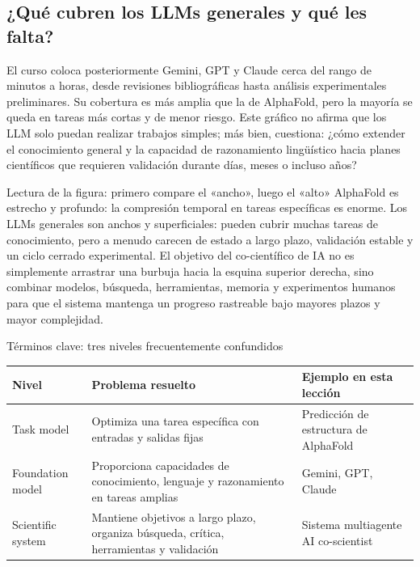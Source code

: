 
\subsection{¿Qué cubren los LLMs generales y qué les falta?}

El curso coloca posteriormente Gemini, GPT y Claude cerca del rango de minutos a horas, desde revisiones bibliográficas hasta análisis experimentales preliminares. Su cobertura es más amplia que la de AlphaFold, pero la mayoría se queda en tareas más cortas y de menor riesgo. Este gráfico no afirma que los LLM solo puedan realizar trabajos simples; más bien, cuestiona: ¿cómo extender el conocimiento general y la capacidad de razonamiento lingüístico hacia planes científicos que requieren validación durante días, meses o incluso años?


\begin{knowledgebox}{Lectura de la figura: primero compare el «ancho», luego el «alto»}
AlphaFold es estrecho y profundo: la compresión temporal en tareas específicas es enorme. Los LLMs generales son anchos y superficiales: pueden cubrir muchas tareas de conocimiento, pero a menudo carecen de estado a largo plazo, validación estable y un ciclo cerrado experimental. El objetivo del co-científico de IA no es simplemente arrastrar una burbuja hacia la esquina superior derecha, sino combinar modelos, búsqueda, herramientas, memoria y experimentos humanos para que el sistema mantenga un progreso rastreable bajo mayores plazos y mayor complejidad.
\end{knowledgebox}

\begin{knowledgebox}{Términos clave: tres niveles frecuentemente confundidos}
\begin{tabular}{L{0.16\textwidth}L{0.31\textwidth}L{0.36\textwidth}}
\toprule
Nivel & Problema resuelto & Ejemplo en esta lección \\
\midrule
Task model & Optimiza una tarea específica con entradas y salidas fijas & Predicción de estructura de AlphaFold \\
Foundation model & Proporciona capacidades de conocimiento, lenguaje y razonamiento en tareas amplias & Gemini, GPT, Claude \\
Scientific system & Mantiene objetivos a largo plazo, organiza búsqueda, crítica, herramientas y validación & Sistema multiagente AI co-scientist \\
\bottomrule
\end{tabular}
\end{knowledgebox}

